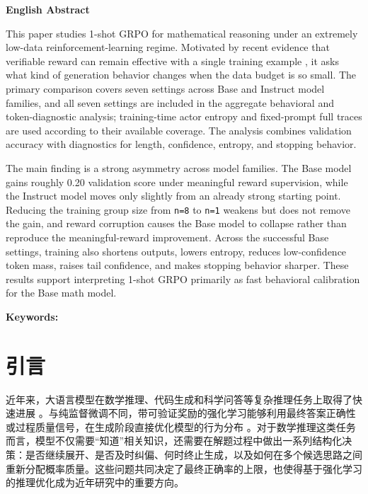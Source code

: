 \documentclass[12pt,a4paper]{ctexart}
\begin{document}
\vspace{1.2em}
\begin{center}
\textbf{English Abstract}
\end{center}
\noindent
This paper studies 1-shot GRPO for mathematical reasoning under an extremely low-data reinforcement-learning regime. Motivated by recent evidence that verifiable reward can remain effective with a single training example \cite{wang2025oneshotrlvr}, it asks what kind of generation behavior changes when the data budget is so small. The primary comparison covers seven settings across Base and Instruct model families, and all seven settings are included in the aggregate behavioral and token-diagnostic analysis; training-time actor entropy and fixed-prompt full traces are used according to their available coverage. The analysis combines validation accuracy with diagnostics for length, confidence, entropy, and stopping behavior.

The main finding is a strong asymmetry across model families. The Base model gains roughly 0.20 validation score under meaningful reward supervision, while the Instruct model moves only slightly from an already strong starting point. Reducing the training group size from \texttt{n=8} to \texttt{n=1} weakens but does not remove the gain, and reward corruption causes the Base model to collapse rather than reproduce the meaningful-reward improvement. Across the successful Base settings, training also shortens outputs, lowers entropy, reduces low-confidence token mass, raises tail confidence, and makes stopping behavior sharper. These results support interpreting 1-shot GRPO primarily as fast behavioral calibration for the Base math model.

\vspace{0.6em}
\noindent\textbf{Keywords:} \ReportKeywordsEN

\tableofcontents
\clearpage
{}

\section{引言}

近年来，大语言模型在数学推理、代码生成和科学问答等复杂推理任务上取得了快速进展 \cite{deepseekr1,kimi15,deepseekmath,alphacode,gpqa}。与纯监督微调不同，带可验证奖励的强化学习能够利用最终答案正确性或过程质量信号，在生成阶段直接优化模型的行为分布 \cite{deepseekr1,lightman2023stepbystep,wang2025oneshotrlvr}。对于数学推理这类任务而言，模型不仅需要“知道”相关知识，还需要在解题过程中做出一系列结构化决策：是否继续展开、是否及时纠偏、何时终止生成，以及如何在多个候选思路之间重新分配概率质量。这些问题共同决定了最终正确率的上限，也使得基于强化学习的推理优化成为近年研究中的重要方向。
\end{document}
